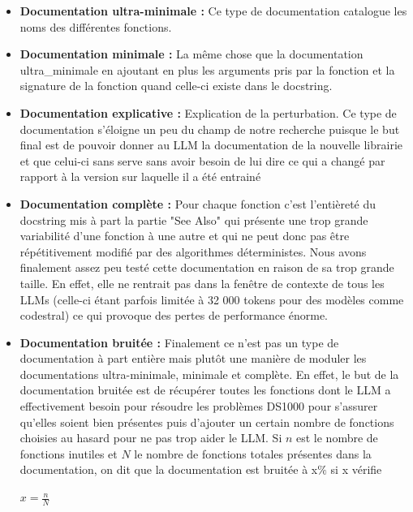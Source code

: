 \documentclass[11pt, a4paper]{article}
\begin{document}
\begin{itemize}
    \item \textbf{Documentation ultra-minimale :} Ce type de documentation catalogue les noms des différentes fonctions.
    \item \textbf{Documentation minimale :} La même chose que la documentation ultra\_minimale en ajoutant en plus les arguments pris par la fonction et la signature de la fonction quand celle-ci existe dans le docstring.
    \item \textbf{Documentation explicative :} Explication de la perturbation. Ce type de documentation s'éloigne un peu du champ de notre recherche puisque le but final est de pouvoir donner au LLM la documentation de la nouvelle librairie et que celui-ci sans serve sans avoir besoin de lui dire ce qui a changé par rapport à la version sur laquelle il a été entrainé  
    \item \textbf{Documentation complète :} Pour chaque fonction c'est l'entièreté du docstring mis à part la partie "See Also" qui présente une trop grande variabilité d'une fonction à une autre et qui ne peut donc pas être répétitivement modifié par des algorithmes déterministes. Nous avons finalement assez peu testé cette documentation en raison de sa trop grande taille. En effet, elle ne rentrait pas dans la fenêtre de contexte de tous les LLMs (celle-ci étant parfois limitée à 32 000 tokens pour des modèles comme codestral) ce qui provoque des pertes de performance énorme.
    \item \textbf{Documentation bruitée :} Finalement ce n'est pas un type de documentation à part entière mais plutôt une manière de moduler les documentations ultra-minimale, minimale et complète. En effet, le but de la documentation bruitée est de récupérer toutes les fonctions dont le LLM a effectivement besoin pour résoudre les problèmes DS1000 pour s'assurer qu'elles soient bien présentes puis d'ajouter un certain nombre de fonctions choisies au hasard pour ne pas trop aider le LLM. Si $n$ est le nombre de fonctions inutiles et $N$ le nombre de fonctions totales présentes dans la documentation, on dit que la documentation est bruitée à x$\%$ si x vérifie 
    \begin{center}
        $x = \frac{n}{N}$
    \end{center}
\end{itemize}
\end{document}
